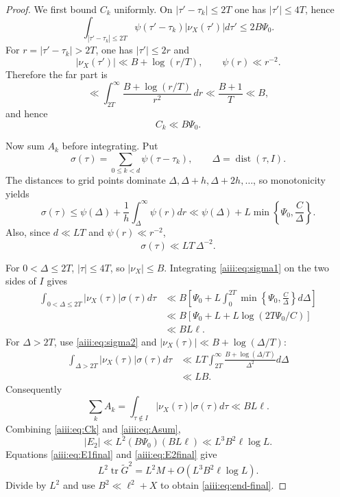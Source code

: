 \documentclass[11pt]{article}
\DeclareMathOperator{\tr}{tr}
\begin{document}
\begin{proof}
We first bound $C_k$ uniformly.  On
$|\tau'-\tau_k|\le2T$ one has $|\tau'|\le4T$, hence
\[
 \int_{|\tau'-\tau_k|\le2T}
 \psi(\tau'-\tau_k)|\nu_X(\tau')|d\tau'
 \le2B\Psi_0.
\]
For $r=|\tau'-\tau_k|>2T$, one has
$|\tau'|\le2r$ and
\[
 |\nu_X(\tau')|\ll B+\log(r/T),\qquad
 \psi(r)\ll r^{-2}.
\]
Therefore the far part is
\[
 \ll
 \int_{2T}^{\infty}
 \frac{B+\log(r/T)}{r^2}\,dr
 \ll \frac{B+1}{T}
 \ll B,
\]
and hence
\begin{equation}\label{aiii:eq:Ck}
 C_k\ll B\Psi_0.
\end{equation}

Now sum $A_k$ before integrating.  Put
\[
 \sigma(\tau)=\sum_{0\le k<d}\psi(\tau-\tau_k),
 \qquad
 \Delta=\operatorname{dist}(\tau,I).
\]
The distances to grid points dominate
$\Delta,\Delta+h,\Delta+2h,\ldots$, so monotonicity yields
\begin{equation}\label{aiii:eq:sigma1}
 \sigma(\tau)
 \le
 \psi(\Delta)+\frac1h\int_\Delta^\infty\psi(r)dr
 \ll
 \psi(\Delta)+L\min\left\{\Psi_0,\frac{C}{\Delta}\right\}.
\end{equation}
Also, since $d\ll LT$ and $\psi(r)\ll r^{-2}$,
\begin{equation}\label{aiii:eq:sigma2}
 \sigma(\tau)\ll LT\,\Delta^{-2}.
\end{equation}

For $0<\Delta\le2T$, $|\tau|\le4T$, so $|\nu_X|\le B$.  Integrating
\eqref{aiii:eq:sigma1} on the two sides of $I$ gives
\begin{align*}
 \int_{0<\Delta\le2T}|\nu_X(\tau)|\sigma(\tau)d\tau
 &\ll
 B\left[
 \Psi_0+
 L\int_0^{2T}
 \min\left\{\Psi_0,\frac{C}{\Delta}\right\}d\Delta
 \right]\\
 &\ll
 B\left[\Psi_0+L+L\log(2T\Psi_0/C)\right]\\
 &\ll BL\ell.
\end{align*}
For $\Delta>2T$, use \eqref{aiii:eq:sigma2} and
$|\nu_X(\tau)|\ll B+\log(\Delta/T)$:
\begin{align*}
 \int_{\Delta>2T}|\nu_X(\tau)|\sigma(\tau)d\tau
 &\ll
 LT\int_{2T}^{\infty}
 \frac{B+\log(\Delta/T)}{\Delta^2}d\Delta\\
 &\ll LB.
\end{align*}
Consequently
\begin{equation}\label{aiii:eq:Asum}
 \sum_kA_k
 =
 \int_{\tau\notin I}|\nu_X(\tau)|\sigma(\tau)d\tau
 \ll BL\ell.
\end{equation}
Combining \eqref{aiii:eq:Ck} and \eqref{aiii:eq:Asum},
\begin{equation}\label{aiii:eq:E2final}
 |E_2|
 \ll
 L^2(B\Psi_0)(BL\ell)
 \ll
 L^3B^2\ell\log L.
\end{equation}
Equations \eqref{aiii:eq:E1final} and \eqref{aiii:eq:E2final} give
\[
 L^2\tr\widetilde G^2
 =
 L^2M+
 O(L^3B^2\ell\log L).
\]
Divide by $L^2$ and use
$B^2\ll\ell^2+X$ to obtain \eqref{aiii:eq:end-final}.
\end{proof}
\end{document}
